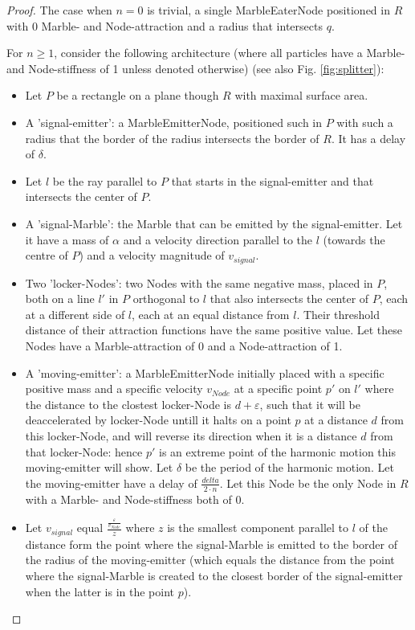 \begin{proof}
    The case when $n = 0$ is trivial, a single MarbleEaterNode positioned in $R$ with 0 Marble- and Node-attraction and a radius that intersects $q$.
    
    For $n \geq 1$, consider the following architecture (where all particles have a Marble- and Node-stiffness of 1 unless denoted otherwise) (see also Fig. \ref{fig:splitter}):
    \begin{itemize}
        \item Let $P$ be a rectangle on a plane though $R$ with maximal surface area.
        \item A 'signal-emitter': a MarbleEmitterNode, positioned such in $P$ with such a radius that the border of the radius intersects the border of $R$. It has a delay of $\delta$.
        \item Let $l$ be the ray parallel to $P$ that starts in the signal-emitter and that intersects the center of $P$.
        \item A 'signal-Marble': the Marble that can be emitted by the signal-emitter. Let it have a mass of $\alpha$ and a velocity direction parallel to the $l$ (towards the centre of $P$) and a velocity magnitude of $v_{signal}$. 
        \item Two 'locker-Nodes': two Nodes with the same negative mass, placed in $P$, both on a line $l'$ in $P$ orthogonal to $l$ that also intersects the center of $P$, each at a different side of $l$, each at an equal distance from $l$. Their threshold distance of their attraction functions have the same positive value. Let these Nodes have a Marble-attraction of 0 and a Node-attraction of 1.
        \item A 'moving-emitter': a MarbleEmitterNode initially placed with a specific positive mass and a specific velocity $v_{Node}$ at a specific point $p'$ on $l'$ where the distance to the clostest locker-Node is $d + \varepsilon$, such that it will be deaccelerated by locker-Node untill it halts on a point $p$ at a distance $d$ from this locker-Node, and will reverse its direction when it is a distance $d$ from that locker-Node: hence $p'$ is an extreme point of the harmonic motion this moving-emitter will show. Let $\delta$ be the period of the harmonic motion. Let the moving-emitter have a delay of $\frac{delta}{2\cdot n}$. Let this Node be the only Node in $R$ with a Marble- and Node-stiffness both of 0.
        \item Let $v_{signal}$ equal $\frac{\frac{\varepsilon}{v_{Node}}}{z}$  where $z$ is the smallest component parallel to $l$ of the distance form the point where the signal-Marble is emitted to the border of the radius of the moving-emitter (which equals the distance from the point where the signal-Marble is created to the closest border of the signal-emitter when the latter is in the point $p$).

\end{itemize}
\end{proof}
